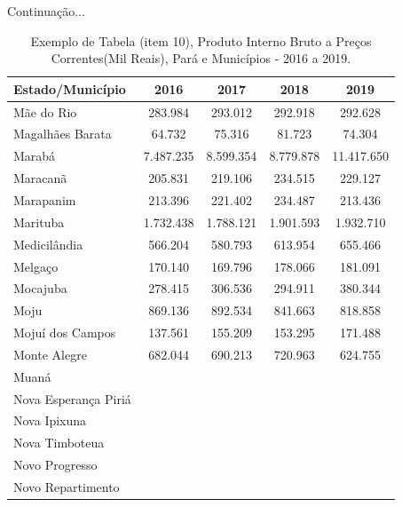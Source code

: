 \newpage
\begin{table}[!htb]
    \centering
    {
    \caption{Exemplo de Tabela (item 10), Produto Interno Bruto a Preços Correntes(Mil Reais), Pará e Municípios - 2016 a 2019.}  Continuação...
    \label{item 10 regras3}
    \vspace{0.1cm}
\begin{tabular}{l|c|c|c|c}
  \hline\hline
  Estado/Município        &    2016    &    2017    &  2018      &  2019    \\
  \hline\hline
   Mãe do Rio             &  283.984   &  293.012   &  292.918   & 292.628   \\
   Magalhães Barata       &  64.732    &  75.316    &  81.723    & 74.304    \\
   Marabá                 &  7.487.235 &  8.599.354 &  8.779.878 & 11.417.650 \\
   Maracanã               & 205.831    &  219.106   &  234.515   & 229.127    \\ 
   Marapanim              & 213.396    &  221.402   &  234.487   & 213.436    \\
   Marituba               & 1.732.438  & 1.788.121  &  1.901.593 &  1.932.710  \\
   Medicilândia           & 566.204    & 580.793    &  613.954   &  655.466    \\
   Melgaço                & 170.140    & 169.796    &  178.066   &  181.091     \\
   Mocajuba               & 278.415    & 306.536    &  294.911   &   380.344     \\
   Moju                   & 869.136    & 892.534    & 841.663    & 818.858      \\
   Mojuí dos Campos       & 137.561    & 155.209    & 153.295    & 171.488      \\
   Monte Alegre           & 682.044    & 690.213    & 720.963    & 624.755      \\
   Muaná                  &             &             &             &    \\
   Nova Esperança Piriá   &             &             &             &    \\
   Nova Ipixuna           &             &             &             &    \\
   Nova Timboteua         &             &             &             &   \\
   Novo Progresso         &             &             &             &    \\
   Novo Repartimento      &             &             &             &    \\

\end{tabular}}
\end{table}
